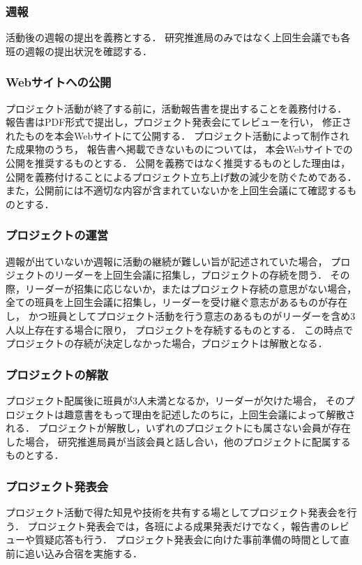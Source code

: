 \subsubsection*{週報}
活動後の週報の提出を義務とする．
研究推進局のみではなく上回生会議でも各班の週報の提出状況を確認する．

\subsubsection*{Webサイトへの公開}
プロジェクト活動が終了する前に，活動報告書を提出することを義務付ける．
報告書はPDF形式で提出し，プロジェクト発表会にてレビューを行い，
修正されたものを本会Webサイトにて公開する．
プロジェクト活動によって制作された成果物のうち，
報告書へ掲載できないものについては，
本会Webサイトでの公開を推奨するものとする．
公開を義務ではなく推奨するものとした理由は，
公開を義務付けることによるプロジェクト立ち上げ数の減少を防ぐためである．
また，公開前には不適切な内容が含まれていないかを上回生会議にて確認するものとする．

\subsubsection*{プロジェクトの運営}
週報が出ていないか週報に活動の継続が難しい旨が記述されていた場合，
プロジェクトのリーダーを上回生会議に招集し，プロジェクトの存続を問う．
その際，リーダーが招集に応じないか，またはプロジェクト存続の意思がない場合，
全ての班員を上回生会議に招集し，リーダーを受け継ぐ意志があるものが存在し，
かつ班員としてプロジェクト活動を行う意志のあるものがリーダーを含め3人以上存在する場合に限り，
プロジェクトを存続するものとする．
この時点でプロジェクトの存続が決定しなかった場合，プロジェクトは解散となる．

\subsubsection*{プロジェクトの解散}
プロジェクト配属後に班員が3人未満となるか，リーダーが欠けた場合，
そのプロジェクトは趣意書をもって理由を記述したのちに，上回生会議によって解散される．
プロジェクトが解散し，いずれのプロジェクトにも属さない会員が存在した場合，
研究推進局員が当該会員と話し合い，他のプロジェクトに配属するものとする．

\subsubsection*{プロジェクト発表会}
プロジェクト活動で得た知見や技術を共有する場としてプロジェクト発表会を行う．
プロジェクト発表会では，各班による成果発表だけでなく，報告書のレビューや質疑応答も行う．
プロジェクト発表会に向けた事前準備の時間として直前に追い込み合宿を実施する．　